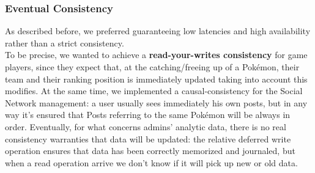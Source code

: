 \subsubsection{Eventual Consistency}
As described before, we preferred guaranteeing low latencies and high availability rather than a strict consistency.\\ 
To be precise, we wanted to achieve a \textbf{read-your-writes consistency} for game players, since they expect that, at the catching/freeing up of a Pokémon, their team and their ranking position is immediately updated taking into account this modifies.
At the same time, we implemented a causal-consistency for the Social Network management: a user usually sees immediately his own posts, but in any way it’s ensured that Posts referring to the same Pokémon will be always in order.
Eventually, for what concerns admins’ analytic data, there is no real consistency warranties that data will be updated: the relative deferred write operation ensures that data has been correctly memorized and journaled, but when a read operation arrive we don’t know if it will pick up new or old data.
